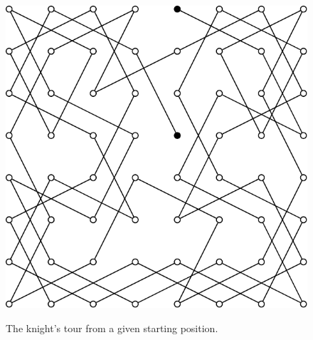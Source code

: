 \begin{figure}[!htbp]
{  \includegraphics{image/graph-algorithms/one-knight-tour_graph}
}
\caption{The knight's tour from a given starting position.}
\label{fig:graph_algorithms:one_knight_tour}
\end{figure}

